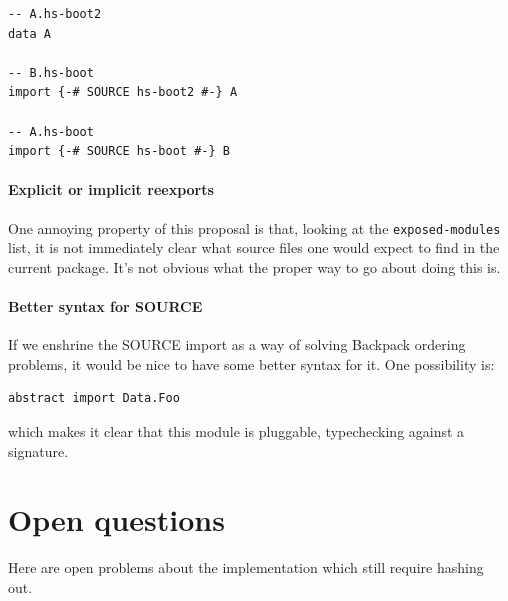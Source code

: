 \documentclass{article}
\begin{document}
\begin{verbatim}
-- A.hs-boot2
data A

-- B.hs-boot
import {-# SOURCE hs-boot2 #-} A

-- A.hs-boot
import {-# SOURCE hs-boot #-} B
\end{verbatim}

\paragraph{Explicit or implicit reexports}  One annoying property of
this proposal is that, looking at the \verb|exposed-modules| list, it is
not immediately clear what source files one would expect to find in the
current package.  It's not obvious what the proper way to go about doing
this is.

\paragraph{Better syntax for SOURCE}  If we enshrine the SOURCE import
as a way of solving Backpack ordering problems, it would be nice to have
some better syntax for it. One possibility is:

\begin{verbatim}
abstract import Data.Foo
\end{verbatim}

which makes it clear that this module is pluggable, typechecking against
a signature.

\section{Open questions}\label{sec:open-questions}

Here are open problems about the implementation which still require
hashing out.
\end{document}

